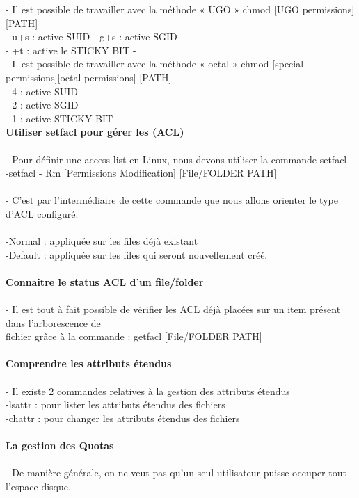 \documentclass[10pt,a4paper]{article}
\begin{document}
- Il est possible de travailler avec la méthode « UGO » chmod [UGO permissions] [PATH]  \\
- u+s : active SUID - g+s : active SGID \\
- +t : active le STICKY BIT -\\
- Il est possible de travailler avec la méthode « octal » chmod [special permissions][octal permissions] [PATH] \\
- 4 : active SUID \\
- 2 : active SGID \\
- 1 : active STICKY BIT\\
{\large\textbf{Utiliser setfacl pour gérer les (ACL) }}\\\\
- Pour définir une access list en Linux, nous devons utiliser la commande setfacl \\
-setfacl - Rm [Permissions Modification] [File/FOLDER PATH]  \\\\
- C’est par l’intermédiaire de cette commande que nous allons orienter le type d’ACL configuré.\\ \\
-Normal : appliquée sur les files déjà existant  \\
-Default : appliquée sur les files qui seront nouvellement créé. \\\\
{\large\textbf{Connaitre le status ACL d’un file/folder }}\\\\
- Il est tout à fait possible de vérifier les ACL déjà placées sur un item présent dans l’arborescence de\\ fichier grâce à la commande 
 : getfacl [File/FOLDER PATH] \\\\
{\large\textbf{Comprendre les attributs étendus}}\\\\
- Il existe 2 commandes relatives à la gestion des attributs étendus \\
-lsattr : pour lister les attributs étendus des fichiers\\
-chattr : pour changer les attributs étendus des fichiers \\\\
{\large\textbf{La gestion des Quotas }}\\\\
- De manière générale, on ne veut pas qu'un seul utilisateur puisse occuper tout l'espace disque, \\
\end{document}

